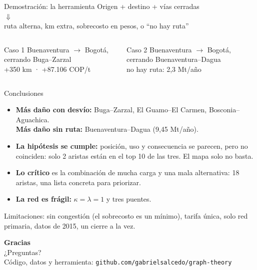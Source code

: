 \documentclass[aspectratio=169, 11pt]{beamer}
\begin{document}
\begin{frame}{Demostración: la herramienta}
  \centering
  {\large Origen \quad + \quad destino \quad + \quad vías cerradas}\\[0.6em]
  $\Downarrow$\\[0.6em]
  {\large ruta alterna, km extra, sobrecosto en pesos, o ``no hay ruta''}\\[2em]
  \begin{columns}[T]
      \begin{block}{Caso 1}\small
        Buenaventura $\to$ Bogotá, cerrando Buga--Zarzal\\
        +350 km · +87.106 COP/t
      \end{block}
      \begin{block}{Caso 2}\small
        Buenaventura $\to$ Bogotá, cerrando Buenaventura--Dagua\\
        no hay ruta: 2,3 Mt/año
      \end{block}
  \end{columns}
\end{frame}

\begin{frame}{Conclusiones}
  \begin{itemize}
    \item \textbf{Más daño con desvío:} Buga--Zarzal, El Guamo--El Carmen,
          Bosconia--Aguachica.\\
          \textbf{Más daño sin ruta:} Buenaventura--Dagua (9,45 Mt/año).
    \item \textbf{La hipótesis se cumple:} posición, uso y consecuencia se parecen,
          pero no coinciden: solo 2 aristas están en el top 10 de las tres. El mapa solo
          no basta.
    \item \textbf{Lo crítico} es la combinación de mucha carga y una mala alternativa:
          18 aristas, una lista concreta para priorizar.
    \item \textbf{La red es frágil:} $\kappa = \lambda = 1$ y tres puentes.
  \end{itemize}
  \vspace{0.6em}
  \small\color{suave}
  Limitaciones: sin congestión (el sobrecosto es un mínimo), tarifa única, solo red
  primaria, datos de 2015, un cierre a la vez.
\end{frame}

\begin{frame}
  \centering
  {\Huge\bfseries Gracias}\\[1.5em]
  \large ¿Preguntas?\\[2em]
  \small\color{suave}
  Código, datos y herramienta: \texttt{github.com/gabrielsalcedo/graph-theory}
\end{frame}
\end{document}
